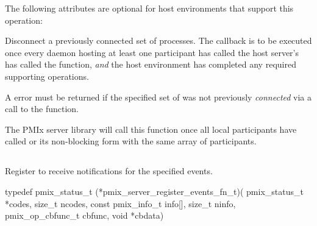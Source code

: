 \optattrstart
The following attributes are optional for host environments that support this operation:


\optattrend

\descr

Disconnect a previously connected set of processes. The callback is to be executed once every daemon hosting at least one participant has called the host server's has called the  function, \textit{and} the host environment has completed any required supporting operations.

\advicermstart
A  error must be returned if the specified set of  was not previously \textit{connected} via a call to the  function.

The \ac{PMIx} server library will
call this function once all local participants have called  or its non-blocking form with the same array of participants.

\advicermend


\subsection{}

\summary

Register to receive notifications for the specified events.

\format

\cspecificstart
\begin{codepar}
 typedef pmix_status_t (*pmix_server_register_events_fn_t)(
                              pmix_status_t *codes,
                              size_t ncodes,
                              const pmix_info_t info[],
                              size_t ninfo,
                              pmix_op_cbfunc_t cbfunc,
                              void *cbdata)
\end{codepar}
\cspecificend

\begin{arglist}
\end{arglist}

